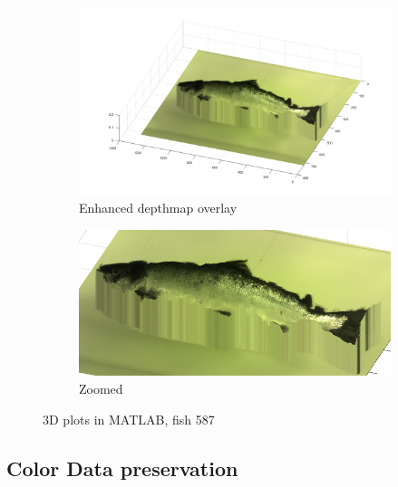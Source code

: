 \begin{figure}[H]
    \medskip
    \begin{subfigure}{0.41\textwidth}
        \includegraphics[width=\linewidth]{images/results/3D_plots/fixed_3D_fish_87}
        \caption{Enhanced depthmap overlay}
    \end{subfigure}\hspace*{\fill}
    \begin{subfigure}{0.57\textwidth}
        \includegraphics[width=\linewidth]{images/results/3D_plots/zoomed_fixed_3D_fish_87}
        \caption{Zoomed}
    \end{subfigure}
    
    \caption{3D plots in MATLAB, fish 587} 
    \label{fig:3D_plot_87}
\end{figure}
\newpage




\subsection{Color Data preservation}

